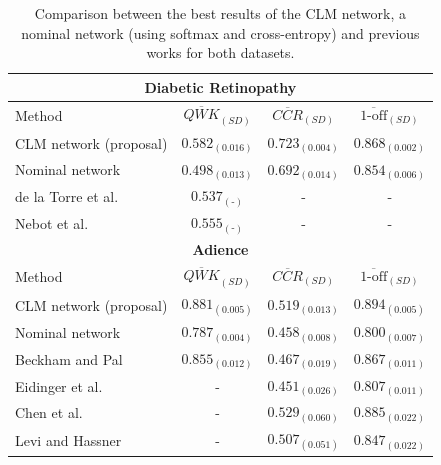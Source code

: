 \documentclass[preprint]{elsarticle}
\begin{document}
\begin{table}[!t]
	\caption{Comparison between the best results of the CLM network, a nominal network (using softmax and cross-entropy) and previous works for both datasets.}
	\label{table:Comparison}
	\scriptsize
	\centering
	\def\arraystretch{1.3}
	\begin{tabular}{lccc}
		\hline\hline
		\multicolumn{4}{c}{\textbf{Diabetic Retinopathy}}\\
		\hline
		Method                                    & $\overline{QWK}_{(SD)}$ & $\overline{CCR}_{(SD)}$ & $\overline{\text{1-off}}_{(SD)}$ \\ \hline
		CLM network (proposal)                          &    $0.582_{(0.016)}$    &    $0.723_{(0.004)}$    &        $0.868_{(0.002)}$         \\
		Nominal network                           &    $0.498_{(0.013)}$    &    $0.692_{(0.014)}$    &        $0.854_{(0.006)}$         \\
		de la Torre et al. \cite{de2018weighted}     &  $0.537_{(\text{-})}$   &            -            &                -                 \\
		Nebot et al. \cite{nebot2016diabetic}  &  $0.555_{(\text{-})}$   &            -            &                -                 \\
		\hline
		\multicolumn{4}{c}{\textbf{Adience}}\\
		\hline
		Method                                    & $\overline{QWK}_{(SD)}$ & $\overline{CCR}_{(SD)}$ & $\overline{\text{1-off}}_{(SD)}$ \\ \hline
		CLM network (proposal)                          &    $0.881_{(0.005)}$    &    $0.519_{(0.013)}$    &        $0.894_{(0.005)}$         \\
		Nominal network                           &    $0.787_{(0.004)}$    &    $0.458_{(0.008)}$    &        $0.800_{(0.007)}$         \\
		Beckham and Pal \cite{beckham2017unimodal} &    $0.855_{(0.012)}$    &    $0.467_{(0.019)}$    &        $0.867_{(0.011)}$         \\
		Eidinger et al. \cite{eidinger2014age} &            -            &    $0.451_{(0.026)}$    &        $0.807_{(0.011)}$         \\
		Chen et al. \cite{chen2016cascaded} &            -            &    $0.529_{(0.060)}$    &        $0.885_{(0.022)}$         \\
		Levi and Hassner \cite{levi2015age}         &            -            &    $0.507_{(0.051)}$    &        $0.847_{(0.022)}$         \\ \hline\hline
	\end{tabular}
\end{table}
\end{document}
